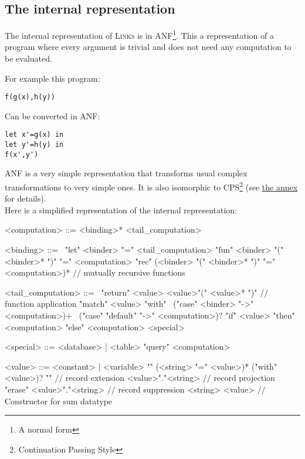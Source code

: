 \documentclass[11pt]{article}
\newcommand\mysc[1]{{\rmfamily\textsc{#1}}\xspace}
\newcommand\links{\mysc{Links}}
\renewcommand\comment[1]{{\color{gray} $//$ #1}}
\begin{document}
\subsection{The internal representation \label{ir}}

The internal representation of \links is in ANF\footnote{A normal form}. This a representation of a program where every argument is trivial and does not need any computation to be evaluated. 

For example this program:
\begin{lstlisting}[language={[Objective]Caml}]
f(g(x),h(y))
\end{lstlisting}
Can be converted in ANF:
\begin{lstlisting}[language={[Objective]Caml}]
let x'=g(x) in
let y'=h(y) in
f(x',y')
\end{lstlisting}

ANF is a very simple representation that transforms usual complex transformations to very simple ones. It is also isomorphic to CPS\footnote{Continuation Passing Style} (see \hyperref[cps]{the annex} for details).\\

Here is a simplified representation of the internal representation:

\begin{grammar}
<computation> ::= <binding>* <tail_computation>

<binding> ::= \
\alt "let" <binder> "=" <tail_computation>
\alt "fun" <binder> "(" <binder>* ")" "=" <computation>
\alt "rec" (<binder> "(" <binder>* ")" "=" <computation>)* \comment{mutually recursive functions}

<tail_computation> ::= \ 
\alt "return" <value>
\alt <value>"(" <value>* ")" \comment{function application}
\alt "match" <value> "with" \ 
  ("case" <binder> "->" <computation>)+ \ 
  ("case" "default" "->" <computation>)?
\alt "if" <value> "then" <computation> "else" <computation>
\alt <special>

<special> ::= <database> | <table>
\alt "query" <computation>

<value> ::= <constant> | <variable>
\alt "{" (<string> "=" <value>)* ("with" <value>)? "}" \comment{record extension}
\alt <value>"."<string> \comment{record projection}
\alt "erase" <value>"."<string> \comment{record suppression}
\alt <string> <value> \comment{Constructor for sum datatype}
\end{grammar}
\end{document}
